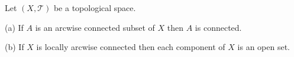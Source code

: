 Let $(X, \mathcal{T})$ be a topological space.

(a) If $A$ is an arcwise connected subset of $X$ then $A$ is connected.

(b) If $X$ is locally arcwise connected then each component of $X$ is an open set.
